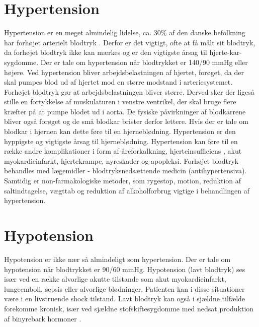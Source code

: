 \section{Hypertension} 
Hypertension er en meget almindelig lidelse, ca. 30\% af den danske befolkning har forhøjet arterielt blodtryk \cite{Hypertension}. Derfor er det vigtigt, ofte at få målt sit blodtryk, da forhøjet blodtryk ikke kan mærkes og er den vigtigste årsag til hjerte-kar-sygdomme. 
Der er tale om hypertension når blodtrykket er 140/90 mmHg eller højere.
Ved hypertension bliver arbejdsbelastningen af hjertet, forøget, da der skal pumpes blod ud af hjertet mod en større modstand i arteriesystemet. \\
Forhøjet blodtryk gør at arbejdsbelastningen bliver større. Derved sker der ligeså stille en fortykkelse af muskulaturen i venstre ventrikel, der skal bruge flere kræfter på at pumpe blodet ud i aorta. 
De fysiske påvirkninger af blodkarrene bliver også forøget og de små blodkar brister derfor lettere. Hvis der er tale om blodkar i hjernen kan dette føre til en hjerneblødning. Hypertension er den hyppigste og vigtigste årsag til hjerneblødning.
Hypertension kan føre til en række andre komplikationer i form af åreforkalkning, hjerteinsufficiens \cite{Hjerteinsufficiens}, akut myokardieinfarkt, hjertekrampe, nyreskader og apopleksi.
Forhøjet blodtryk behandles med lægemidler - blodtryksnedsættende medicin (antihypertensiva). Samtidig er non-farmakologiske metoder, som rygestop, motion, reduktion af saltindtagelse, vægttab og reduktion af alkoholforbrug vigtige i behandlingen af hypertension. 

\section{Hypotension} 
Hypotension er ikke nær så almindeligt som hypertension. Der er tale om hypotension når blodtrykket er 90/60 mmHg. Hypotension (lavt blodtryk) ses især ved en række alvorlige akutte tilstande som akut myokardieinfarkt, lungeemboli, sepsis eller alvorlige blødninger. Patienten kan i disse situationer være i en livstruende shock tilstand. Lavt blodtryk kan også i sjældne tilfælde forekomme kronisk, især ved sjældne stofskiftesygdomme med nedsat produktion af binyrebark hormoner \nocite{Hypotension}.   